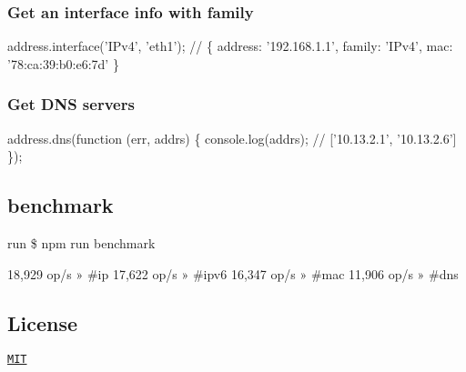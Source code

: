 \subsubsection*{Get an interface info with family}


\begin{DoxyCode}
address.interface('IPv4', 'eth1');
// \{ address: '192.168.1.1', family: 'IPv4', mac: '78:ca:39:b0:e6:7d' \}
\end{DoxyCode}


\subsubsection*{Get D\+NS servers}


\begin{DoxyCode}
address.dns(function (err, addrs) \{
  console.log(addrs);
  // ['10.13.2.1', '10.13.2.6']
\});
\end{DoxyCode}


\subsection*{benchmark}

run {\ttfamily \$ npm run benchmark}


\begin{DoxyCode}
18,929 op/s » #ip
17,622 op/s » #ipv6
16,347 op/s » #mac
11,906 op/s » #dns
\end{DoxyCode}


\subsection*{License}

\href{LICENSE.txt}{\tt M\+IT} 